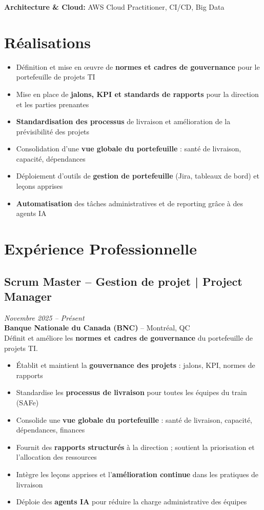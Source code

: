 \documentclass[11pt,a4paper]{article}
\begin{document}
\textbf{Architecture \& Cloud:} AWS Cloud Practitioner, CI/CD, Big Data

\vspace{6pt}

\section*{Réalisations}
\begin{itemize}
    \item Définition et mise en œuvre de \textbf{normes et cadres de gouvernance} pour le portefeuille de projets TI
    \item Mise en place de \textbf{jalons, KPI et standards de rapports} pour la direction et les parties prenantes
    \item \textbf{Standardisation des processus} de livraison et amélioration de la prévisibilité des projets
    \item Consolidation d'une \textbf{vue globale du portefeuille} : santé de livraison, capacité, dépendances
    \item Déploiement d'outils de \textbf{gestion de portefeuille} (Jira, tableaux de bord) et leçons apprises
    \item \textbf{Automatisation} des tâches administratives et de reporting grâce à des agents IA
\end{itemize}

\section*{Expérience Professionnelle}

\subsection*{Scrum Master -- Gestion de projet | Project Manager} \hfill \textit{Novembre 2025 -- Présent}\\
\textbf{Banque Nationale du Canada (BNC)} -- Montréal, QC\\
Définit et améliore les \textbf{normes et cadres de gouvernance} du portefeuille de projets TI.
\begin{itemize}
    \item Établit et maintient la \textbf{gouvernance des projets} : jalons, KPI, normes de rapports
    \item Standardise les \textbf{processus de livraison} pour toutes les équipes du train (SAFe)
    \item Consolide une \textbf{vue globale du portefeuille} : santé de livraison, capacité, dépendances, finances
    \item Fournit des \textbf{rapports structurés} à la direction ; soutient la priorisation et l'allocation des ressources
    \item Intègre les leçons apprises et l'\textbf{amélioration continue} dans les pratiques de livraison
    \item Déploie des \textbf{agents IA} pour réduire la charge administrative des équipes
\end{itemize}
\end{document}
